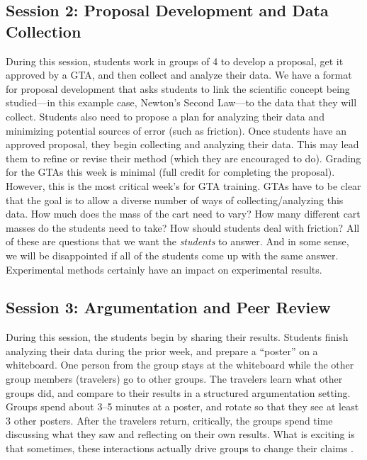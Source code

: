 \documentclass[aip, numerical, preprint]{revtex4-2}
\begin{document}
\subsection{Session 2: Proposal Development and Data Collection}
During this session, students work in groups of 4 to develop a proposal, get it approved by a
GTA, and then collect and analyze their data.  We have a format for proposal development that
asks students to link the scientific concept being studied---in this example case, Newton's
Second Law---to the data that they will collect.  Students also need to propose a plan for
analyzing their data and minimizing potential sources of error (such as friction).  Once
students have an approved proposal, they begin collecting and analyzing their data.  This may
lead them to refine or revise their method (which they are encouraged to do).  Grading for the
GTAs this week is minimal (full credit for completing the proposal).  However, this is the most
critical week's for GTA training.  GTAs have to be clear that the goal is to allow a diverse
number of ways of collecting/analyzing this data.  How much does the mass of the cart need to
vary?  How many different cart masses do the students need to take?  How should students deal
with friction? All of these are questions that we want the \textit{students} to answer.  And in
some sense, we will be disappointed if all of the students come up with the same answer.
Experimental methods certainly have an impact on experimental results.

\subsection{Session 3: Argumentation and Peer Review}
During this session, the students begin by sharing their results.  Students finish analyzing
their data during the prior week, and prepare a ``poster'' on a whiteboard.  One person from
the group stays at the whiteboard while the other group members (travelers) go to other groups.
The travelers learn what other groups did, and compare to their results in a structured
argumentation setting.  Groups spend about 3--5 minutes at a poster, and rotate so that they
see at least 3 other posters.  After the travelers return, critically, the groups spend time
discussing what they saw and reflecting on their own results.  What is exciting is that
sometimes, these interactions actually drive groups to change their claims \citep{Walker2019}.
\end{document}
